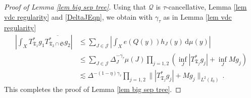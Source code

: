 \begin{proof}[Proof of Lemma \ref{lem big sep tree}]
    Using that $\mathcal{Q}$ is $\tau$-cancellative, Lemma \ref{lem vdc regularity} and \eqref{DeltaJEqn}, we obtain with $\gamma_{\tau}$ as in Lemma \ref{lem vdc regularity}
    \begin{align*}
        \left| \int_{X} T_{\mathfrak{T}_1}^* g_1 \overline{T_{\mathfrak{T}_2 \cap \mathfrak{S}}^* g_2 }\right|
        &\leq \sum_{J \in \mathcal{J}} \left|\int_{X} e(Q(y)) h_J(y) \, \mathrm{d}\mu(y) \right|\\
        &\leq \sum_{J \in \mathcal{J}} \Delta_J^{-\gamma_{\tau} } \mu(J) \prod_{j = 1,2}(\inf_{J} |T_{\mathfrak{T}_j}^* g_j| + \inf_J Mg_j)\\
        &\lesssim  \Delta^{-(1 - \eta)\gamma_{\tau} } \prod_{j = 1,2}\| |T_{\mathfrak{T}_j}^* g_j| + Mg_j\|_{L^2(I_0)}\,.
    \end{align*}
    This completes the proof of Lemma \ref{lem big sep tree}.
\end{proof}

